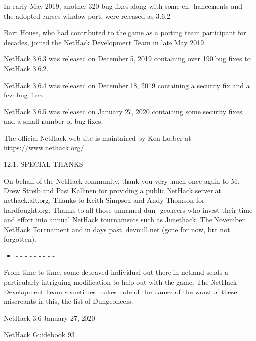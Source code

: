\documentclass[11pt]{article}
\begin{document}
   In early May 2019, another 320 bug fixes along with some en-
hancements and the adopted curses window port, were released as
3.6.2.

   Bart House, who had contributed to the game as a porting
team participant for decades, joined the NetHack Development Team
in late May 2019.

   NetHack 3.6.3 was released on December 5, 2019 containing
over 190 bug fixes to NetHack 3.6.2.

   NetHack 3.6.4 was released on December 18, 2019 containing a
security fix and a few bug fixes.

   NetHack 3.6.5 was released on January 27, 2020 containing
some security fixes and a small number of bug fixes.

   The official NetHack web site is maintained by Ken Lorber at
\url{https://www.nethack.org/}.

12.1. SPECIAL THANKS

   On behalf of the NetHack community, thank you very much once
again to M. Drew Streib and Pasi Kallinen for providing a public
NetHack server at nethack.alt.org. Thanks to Keith Simpson and
Andy Thomson for hardfought.org. Thanks to all those unnamed dun-
geoneers who invest their time and effort into annual NetHack
tournaments such as Junethack, The November NetHack Tournament
and in days past, devnull.net (gone for now, but not forgotten).

\begin{itemize}
\item - - - - - - - - -
\end{itemize}

   From time to time, some depraved individual out there in
netland sends a particularly intriguing modification to help out
with the game. The NetHack Development Team sometimes makes note
of the names of the worst of these miscreants in this, the list
of Dungeoneers:


NetHack 3.6                   January 27, 2020





NetHack Guidebook                       93
\end{document}

